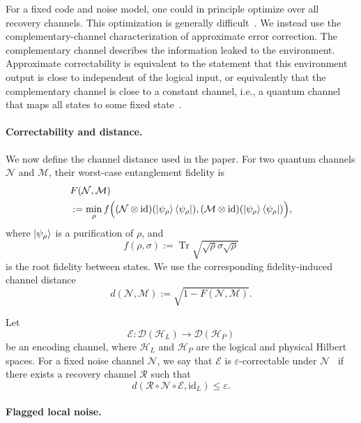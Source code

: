 \documentclass[10pt,twocolumn,superscriptaddress,aps,amsmath,amssymb,citeautoscript,floatfix,prx]{revtex4-2}
\theoremstyle{plain}
\theoremstyle{plain}
\theoremstyle{plain}
\theoremstyle{plain}
\theoremstyle{plain}
\theoremstyle{plain}
\theoremstyle{plain}
\theoremstyle{definition}
\theoremstyle{plain}
\begin{document}
For a fixed code and noise model, one could in principle optimize over all recovery channels. 
This optimization is generally difficult~\cite{PhysRevA.75.012338}. We instead use the complementary-channel 
characterization of approximate error correction. The complementary channel describes the information leaked to the environment. 
Approximate correctability is equivalent to the statement that this environment output is close to independent of the logical input, 
or equivalently that the complementary channel is close to a constant channel, i.e., a quantum channel that maps all states to some fixed 
state~\cite{Beny2010, Faist2020}.

\paragraph{Correctability and distance.}

We now define the channel distance used in the paper. For two quantum channels $\mathcal N$ and $\mathcal M$, their worst-case entanglement fidelity is
$$
\begin{aligned}
&F(\mathcal N,\mathcal M)
\\
&:=
\min_\rho
f\Big(
(\mathcal N\otimes\mathrm{id})
(\ket{\psi_\rho}\bra{\psi_\rho}),
(\mathcal M\otimes\mathrm{id})
(\ket{\psi_\rho}\bra{\psi_\rho})
\Big),
\end{aligned}
$$
where $\ket{\psi_\rho}$ is a purification of $\rho$, and
$$
f(\rho,\sigma)
:=
\operatorname{Tr}
\sqrt{\sqrt\rho\sigma\sqrt\rho}
$$
is the root fidelity between states. We use the corresponding fidelity-induced channel distance
\begin{equation}\label{eq:distance_def}
d(\mathcal N,\mathcal M)
:=
\sqrt{1-F(\mathcal N,\mathcal M)} .
\end{equation}

Let
$$
\mathcal E:
\mathcal D(\mathcal H_L)
\to
\mathcal D(\mathcal H_P)
$$
be an encoding channel, where $\mathcal H_L$ and $\mathcal H_P$ are the logical and physical Hilbert spaces. 
For a fixed noise channel $\mathcal N$, we say that $\mathcal E$ is $\varepsilon$-correctable under $\mathcal N$~\cite{Beny2010} 
if there exists a recovery channel $\mathcal R$ such that
$$
d(\mathcal R\circ\mathcal N\circ\mathcal E,\mathrm{id}_L)
\le
\varepsilon .
$$

\paragraph{Flagged local noise.}
\end{document}
